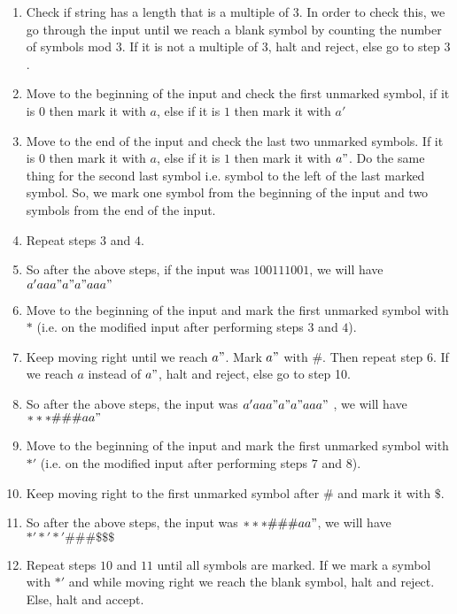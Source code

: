 \documentclass{csc_assignment}
\begin{document}
\begin{description}
\begin{enumerate}
\begin{enumerate}
      \item Check if string has a length that is a multiple of 3. In order to check this, we go through the input until we reach a blank symbol by counting the number of symbols mod $3$. If it is not a multiple of 3, halt and reject, else go to step $3$.
      \item Move to the beginning of the input and check the first unmarked symbol, if it is $0$ then mark it with $a$, else if it is $1$ then mark it with $a'$
      \item Move to the end of the input and check the last two unmarked symbols. If it is $0$ then mark it with $a$, else if it is $1$ then mark it with $a"$. Do the same thing for the second last symbol i.e. symbol to the left of the last marked symbol. So, we mark one symbol from the beginning of the input and two symbols from the end of the input.
      \item Repeat steps $3$ and $4$.
      \item So after the above steps, if the input was $1 0 0 1 1 1 0 0 1$, we will have $a' a a a" a" a" a a a"$ 
      \item Move to the beginning of the input and mark the first unmarked symbol with $*$ (i.e. on the modified input after performing steps $3$ and $4$).
      \item Keep moving right until we reach $a"$. Mark $a"$ with $\#$. Then repeat step 6. If we reach $a$ instead of $a"$, halt and reject, else go to step 10.
      \item So after the above steps, the input was $a' a a a" a" a" a a a"$ , we will have $* * * \# \# \# a a "$
      \item Move to the beginning of the input and mark the first unmarked symbol with $*'$ (i.e. on the modified input after performing steps $7$ and $8$).
      \item Keep moving right to the first unmarked symbol after $\#$ and mark it with $\$$.
      \item So after the above steps, the input was $* * * \# \# \# a a "$, we will have $*' *' *' \# \# \# \$ \$ \$$
      \item Repeat steps $10$ and $11$ until all symbols are marked. If we mark a symbol with $*'$ and while moving right we reach the blank symbol, halt and reject. Else, halt and accept. \\[12pt]
  \end{enumerate}



\end{enumerate}
\end{description}
\end{document}
